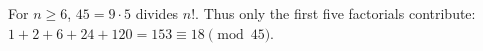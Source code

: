 For $n\ge 6$, $45=9\cdot 5$ divides $n!$. Thus only the first five factorials contribute: $1+2+6+24+120=153\equiv\boxed{18}\pmod{45}$.
